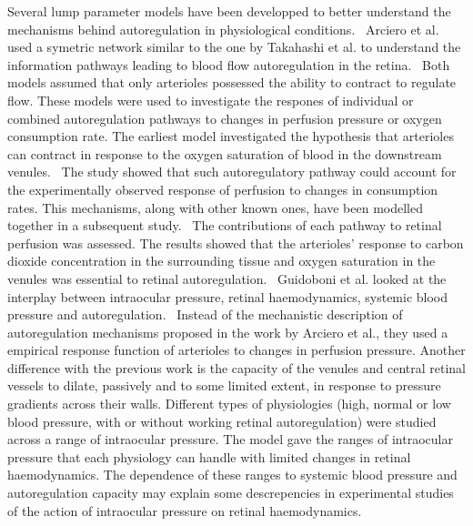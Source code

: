 \documentclass[12pt,a4paper]{journal}
\begin{document}
Several lump parameter models have been developped to better understand the mechanisms behind autoregulation in physiological conditions.~\cite{Arciero_2008,Arciero_2013,Guidoboni_2014a}
Arciero et al. used a symetric network similar to the one by Takahashi et al. to understand the information pathways leading to blood flow autoregulation in the retina.~\cite{Arciero_2008,Arciero_2013}
Both models assumed that only arterioles possessed the ability to contract to regulate flow.
These models were used to investigate the respones of individual or combined autoregulation pathways to changes in perfusion pressure or oxygen consumption rate.
The earliest model investigated the hypothesis that arterioles can contract in response to the oxygen saturation of blood in the downstream venules.~\cite{Arciero_2008}
The study showed that such autoregulatory pathway could account for the experimentally observed response of perfusion to changes in consumption rates.
This mechanisms, along with other known ones, have been modelled together in a subsequent study.~\cite{Arciero_2013}
The contributions of each pathway to retinal perfusion was assessed.
The results showed that the arterioles' response to carbon dioxide concentration in the surrounding tissue and oxygen saturation in the venules was essential to retinal autoregulation.~\cite{Arciero_2013}
Guidoboni et al. looked at the interplay between intraocular pressure, retinal haemodynamics, systemic blood pressure and autoregulation.~\cite{Guidoboni_2014a}
Instead of the mechanistic description of autoregulation mechanisms proposed in the work by Arciero et al., they used a empirical response function of arterioles to changes in perfusion pressure.
Another difference with the previous work is the capacity of the venules and central retinal vessels to dilate, passively and to some limited extent, in response to pressure gradients across their walls.
Different types of physiologies (high, normal or low blood pressure, with or without working retinal autoregulation) were studied across a range of intraocular pressure.
The model gave the ranges of intraocular pressure that each physiology can handle with limited changes in retinal haemodynamics.
The dependence of these ranges to systemic blood pressure and autoregulation capacity may explain some descrepencies in experimental studies of the action of intraocular pressure on retinal haemodynamics.~\cite{Guidoboni_2014a} 
\end{document}
